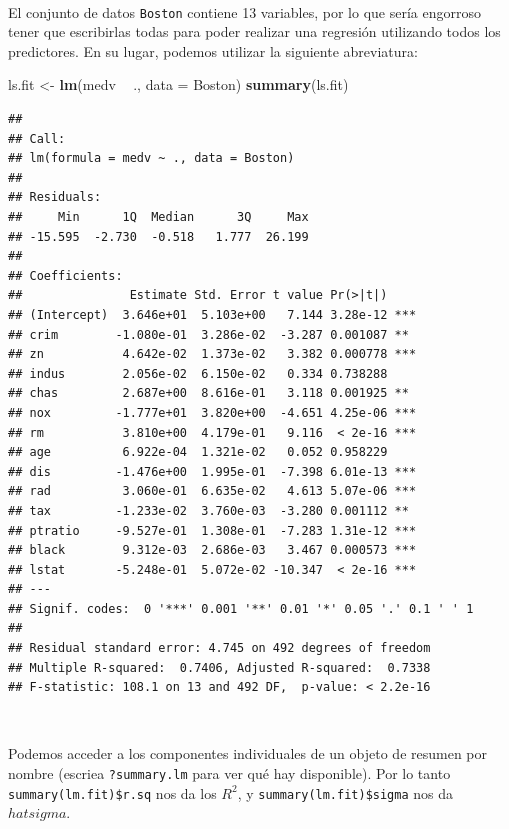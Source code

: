 \documentclass[]{book}
\newenvironment{Shaded}{\begin{snugshade}}{\end{snugshade}}
\newcommand{\KeywordTok}[1]{\textcolor[rgb]{0.13,0.29,0.53}{\textbf{#1}}}
\newcommand{\DataTypeTok}[1]{\textcolor[rgb]{0.13,0.29,0.53}{#1}}
\newcommand{\StringTok}[1]{\textcolor[rgb]{0.31,0.60,0.02}{#1}}
\newcommand{\OperatorTok}[1]{\textcolor[rgb]{0.81,0.36,0.00}{\textbf{#1}}}
\newcommand{\NormalTok}[1]{#1}
\begin{document}
~

El conjunto de datos \texttt{Boston} contiene 13 variables, por lo que
sería engorroso tener que escribirlas todas para poder realizar una
regresión utilizando todos los predictores. En su lugar, podemos
utilizar la siguiente abreviatura:

\begin{Shaded}
\begin{Highlighting}[]
\NormalTok{ls.fit <-}\StringTok{ }\KeywordTok{lm}\NormalTok{(medv }\OperatorTok{~}\StringTok{ }\NormalTok{., }\DataTypeTok{data =}\NormalTok{ Boston)}
\KeywordTok{summary}\NormalTok{(ls.fit)}
\end{Highlighting}
\end{Shaded}

\begin{verbatim}
## 
## Call:
## lm(formula = medv ~ ., data = Boston)
## 
## Residuals:
##     Min      1Q  Median      3Q     Max 
## -15.595  -2.730  -0.518   1.777  26.199 
## 
## Coefficients:
##               Estimate Std. Error t value Pr(>|t|)    
## (Intercept)  3.646e+01  5.103e+00   7.144 3.28e-12 ***
## crim        -1.080e-01  3.286e-02  -3.287 0.001087 ** 
## zn           4.642e-02  1.373e-02   3.382 0.000778 ***
## indus        2.056e-02  6.150e-02   0.334 0.738288    
## chas         2.687e+00  8.616e-01   3.118 0.001925 ** 
## nox         -1.777e+01  3.820e+00  -4.651 4.25e-06 ***
## rm           3.810e+00  4.179e-01   9.116  < 2e-16 ***
## age          6.922e-04  1.321e-02   0.052 0.958229    
## dis         -1.476e+00  1.995e-01  -7.398 6.01e-13 ***
## rad          3.060e-01  6.635e-02   4.613 5.07e-06 ***
## tax         -1.233e-02  3.760e-03  -3.280 0.001112 ** 
## ptratio     -9.527e-01  1.308e-01  -7.283 1.31e-12 ***
## black        9.312e-03  2.686e-03   3.467 0.000573 ***
## lstat       -5.248e-01  5.072e-02 -10.347  < 2e-16 ***
## ---
## Signif. codes:  0 '***' 0.001 '**' 0.01 '*' 0.05 '.' 0.1 ' ' 1
## 
## Residual standard error: 4.745 on 492 degrees of freedom
## Multiple R-squared:  0.7406, Adjusted R-squared:  0.7338 
## F-statistic: 108.1 on 13 and 492 DF,  p-value: < 2.2e-16
\end{verbatim}

~

Podemos acceder a los componentes individuales de un objeto de resumen
por nombre (escriea \texttt{?summary.lm} para ver qué hay disponible).
Por lo tanto \texttt{summary(lm.fit)\$r.sq} nos da los \(R^2\), y
\texttt{summary(lm.fit)\$sigma} nos da \(hat{sigma}\).

~
\end{document}
